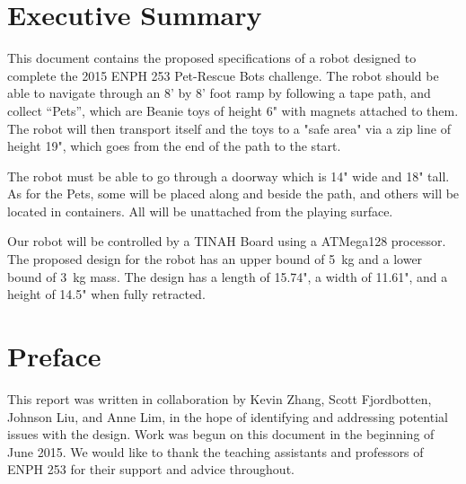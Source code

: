 \documentclass[11pt, oneside]{article} %
\begin{document}
\section*{Executive Summary}
This document contains the proposed specifications of a robot designed to complete the 2015 ENPH 253 Pet-Rescue Bots challenge. The robot should be able to navigate through an 8' by 8' foot ramp by following a tape path, and collect ``Pets'', which are Beanie toys of height 6" with magnets attached to them. The robot will then transport itself and the toys to a "safe area" via a zip line of height 19", which goes from the end of the path to the start.

The robot must be able to go through a doorway which is 14" wide and 18" tall. As for the Pets, some will be placed along and beside the path, and others will be located in containers. All will be unattached from the playing surface.

Our robot will be controlled by a TINAH Board using a ATMega128 processor. The proposed design for the robot has an upper bound of 5~kg and a lower bound of 3~kg mass. The design has a length of 15.74", a width of 11.61", and a height of 14.5" when fully retracted.

\newpage


\tableofcontents %
\listoffigures %
\listoftables %


\newpage

\section{Preface}

This report was written in collaboration by Kevin Zhang, Scott Fjordbotten, Johnson Liu, and Anne Lim, in the hope of identifying and addressing potential issues with the design. Work was begun on this document in the beginning of June 2015. We would like to thank the teaching assistants and professors of ENPH 253 for their support and advice throughout.
\end{document}
